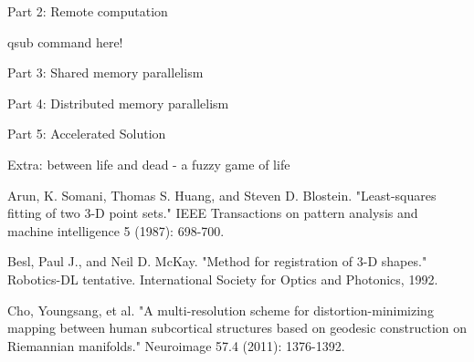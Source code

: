 \documentclass[11pt, twoside]{article}
\begin{document}
\noindent



\begin{center}
	\color{MidnightBlue} {\Large Part 2: Remote computation }\color{Black} 
\end{center}


qsub command here!


\begin{center}
	\color{MidnightBlue} {\Large Part 3: Shared memory parallelism }\color{Black} 
\end{center}



\begin{center}
	\color{MidnightBlue} {\Large Part 4: Distributed memory parallelism }\color{Black} 
\end{center}



\begin{center}
	\color{MidnightBlue} {\Large Part 5: Accelerated Solution }\color{Black} 
\end{center}

\begin{center}
	\color{MidnightBlue} {\Large Extra: between life and dead - a fuzzy game of life }\color{Black} 
\end{center}

\newpage
\begin{thebibliography}{2}
	
	Arun, K. Somani, Thomas S. Huang, and Steven D. Blostein. "Least-squares fitting of two 3-D point sets." IEEE Transactions on pattern analysis and machine intelligence 5 (1987): 698-700.
	
	Besl, Paul J., and Neil D. McKay. "Method for registration of 3-D shapes." Robotics-DL tentative. International Society for Optics and Photonics, 1992.
	
	Cho, Youngsang, et al. "A multi-resolution scheme for distortion-minimizing mapping between human subcortical structures based on geodesic construction on Riemannian manifolds." Neuroimage 57.4 (2011): 1376-1392.	
\end{thebibliography}
\end{document}
